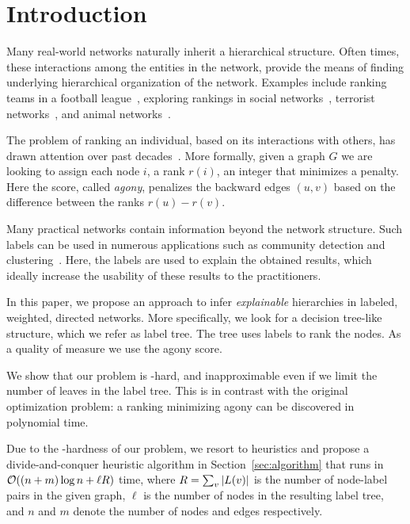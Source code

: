 \section{Introduction}

Many real-world networks naturally inherit a hierarchical structure.
Often times, these interactions among the entities in the network, provide the
means of finding underlying hierarchical organization of the network.
Examples include ranking teams in a football league~\cite{Neumann2018RankingTT},
exploring  rankings in social
networks~\cite{maiya2009inferring,gupte2011finding}, terrorist
networks~\cite{memon2008retracted}, and animal
networks~\cite{jameson1999finding}.


The problem of ranking an individual,  based on its interactions with others,
has drawn attention over past
decades~\cite{gupte2011finding,nikolaj2017tiers,Neumann2018RankingTT}.
More formally, given a graph $G$ we are looking to assign each node $i$, a rank $r(i)$, an integer that minimizes a penalty.
Here the score, called \emph{agony},  penalizes the backward edges $(u, v)$ based on the difference between the ranks $r(u) - r(v)$.

Many practical networks contain information beyond the network
structure. Such labels can be used in
numerous applications such as community
detection and clustering~\cite{pool2014description,
bothorel2015clustering,galbrun2014overlapping,bai2020towards,falih2018community}.
Here, the labels are used to explain the obtained results,
which ideally increase the usability of these results to the practitioners.

In this paper, we propose an approach to infer \emph{explainable} hierarchies in labeled, weighted, directed  networks.
More specifically, we look for a decision tree-like structure, which we refer as label tree. The tree uses labels
to rank the nodes. As a quality of measure we use the agony score.

We show that our problem is \np-hard, and inapproximable even if we limit the
number of leaves in the label tree. This is in contrast with the original
optimization problem: a ranking minimizing agony can be discovered in
polynomial time.

Due to the \np-hardness of our problem, we resort to heuristics
and propose a divide-and-conquer heuristic algorithm in Section~\ref{sec:algorithm} that runs in
$\bigO{(n + m) \log n + \ell R}$ time, where $R = \sum_v {\left|L(v)\right|}$
is the number of node-label pairs in the given graph, $\ell$ is the number of
nodes in the resulting label tree, and $n$ and  $m$ denote the number of nodes
and edges respectively.

